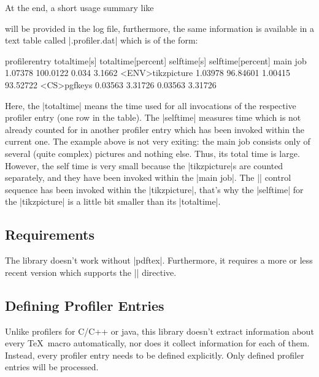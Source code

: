 At the end, a short usage summary like
\noindent will be provided in the log file, furthermore, the same information is available in a text table called |\jobname.profiler.dat| which is of the form:
\begin{codeexample}
profilerentry       totaltime[s]        totaltime[percent]  selftime[s]         selftime[percent]   
main job            1.07378             100.0122            0.034               3.1662              
<ENV>tikzpicture    1.03978             96.84601            1.00415             93.52722            
<CS>pgfkeys         0.03563             3.31726             0.03563             3.31726             
\end{codeexample}
Here, the |totaltime| means the time used for all invocations of the respective profiler entry (one row in the table). The |selftime| measures time which is not already counted for in another profiler entry which has been invoked within the current one. The example above is not very exiting: the main job consists only of several (quite complex) pictures and nothing else. Thus, its total time is large. However, the self time is very small because the |tikzpicture|s are counted separately, and they have been invoked within the |main job|. The |\pgfkeys| control sequence has been invoked within the |tikzpicture|, that's why the |selftime| for the |tikzpicture| is a little bit smaller than its |totaltime|.

\subsection{Requirements}
The library doesn't work without |pdftex|. Furthermore, it requires a more or less recent version which supports the |\pdfelapsedtime| directive.

\subsection{Defining Profiler Entries}
Unlike profilers for C/C++ or java, this library doesn't extract information about every \TeX\ macro automatically, nor does it collect information for each of them. Instead, every profiler entry needs to be defined explicitly. Only defined profiler entries will be processed.

